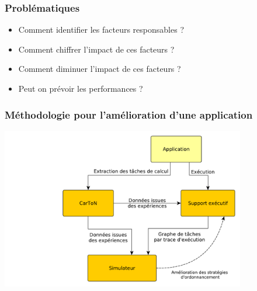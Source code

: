 \documentclass[xcolor={usenames,dvipsnames,svgnames,table}, aspectratio=43]{beamer}
\begin{document}
\begin{frame}
  \frametitle{Problématiques}
  \begin{itemize}
    \item Comment identifier les facteurs responsables ?
    \item Comment chiffrer l'impact de ces facteurs ?
    \item Comment diminuer l'impact de ces facteurs ?
    \item Peut on prévoir les performances ?
  \end{itemize}
\end{frame}

\begin{frame}
  \frametitle{Méthodologie pour l'amélioration d'une application}
  \includegraphics[width=0.8\textwidth]{graph/big_picture.pdf}
\end{frame}
\end{document}
